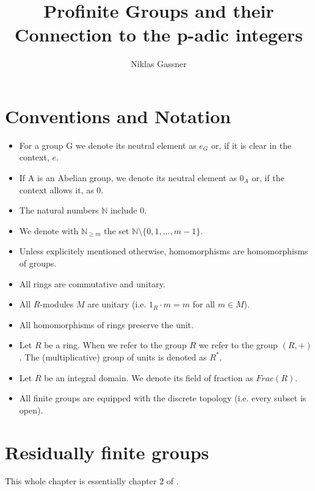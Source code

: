




\title{Profinite Groups and their Connection to the p-adic integers}
\author{Niklas Gassner}


\maketitle

\section{Conventions and Notation}

\begin{itemize}
\item For a group G we denote its neutral element as $e_G$ or, if it is clear in the context, $e$.
\item If A is an Abelian group, we denote its neutral element as $0_A$ or, if the context allows it, as $0$.
\item The natural numbers $\mathbb{N}$ include 0.
\item We denote with $\mathbb{N}_{\geq m}$ the set $\mathbb{N} \setminus \{0,1,...,m-1 \}$.
\item Unless explicitely mentioned otherwise, homomorphisms are homomorphisms of groups.
\item All rings are commutative and unitary.
\item All $R$-modules $M$ are unitary (i.e. $1_R \cdot m = m$ for all $m \in M$).
\item All homomorphisms of rings preserve the unit.
\item Let $R$ be a ring. When we refer to the group $R$ we refer to the group $(R, +)$. The (multiplicative) group of units is denoted as $R^*$.
\item Let $R$ be an integral domain. We denote its field of fraction as $Frac(R)$.
\item All finite groups are equipped with the discrete topology (i.e. every subset is open).
\end{itemize}

\newpage

\section{Residually finite groups}

This whole chapter is essentially chapter 2 of \cite{silberstein}.

